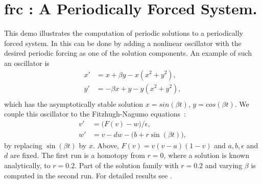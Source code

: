 \documentclass[12pt]{report}
\def\eps{\epsilon}
\begin{document}
\section{ frc : A Periodically Forced System.} \label{sec:Demos_frc}
This demo illustrates the computation of periodic solutions
to a periodically forced system.
In \AUTO this can be done by adding a nonlinear oscillator with
the desired periodic forcing as one of the solution components.
An example of such an oscillator is
\begin{equation} \begin{array}{cl}
 x'&=x + \beta y - x (x^{2} + y^{2}),  \\
 y'&=-\beta x + y - y (x^{2} + y^{2}), \\\end{array} \end{equation}
which has the asymptotically stable solution $x=sin (\beta t)$,
$y=cos (\beta t)$.
We couple this oscillator to the Fitzhugh-Nagumo equations~:
\begin{equation} \begin{array}{cl}
 v'&=\bigl( F(v) - w \bigr) / \eps,  \\
 w'&=v - dw - \bigl( b + r \sin(\beta t) \bigr) ,
\end{array} \end{equation}
by replacing $\sin(\beta t)$ by $x$.
Above, $F(v) = v (v-a) (1-v)$ and $a,b,\eps$ and $d$ are fixed.
The first run is a homotopy from $r=0$, where a solution is known analytically,
to $r=0.2$.
Part of the solution family with $r=0.2$ and varying $\beta$ 
is computed in the second run.
For detailed results see 
 \citeyear{AlDoOt:90}.
\end{document}
